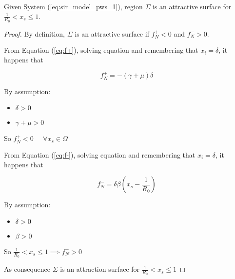 \begin{lemma}
Given System (\ref{eq:sir_model_pws_1}), region $\Sigma$ is an attractive surface for $\frac{1}{R_0} < x_s \leq 1$.
\end{lemma}

\begin{proof}
By definition, $\Sigma$ is an attractive surface if $f^+_N < 0$ and $f^-_N > 0$.

From Equation (\ref{eq:f+}), solving equation and remembering that $x_i = \delta$, it happens that

\begin{equation}
    f^+_N = -(\gamma + \mu)\delta
\end{equation}

By assumption:
\begin{itemize}
    \item $\delta > 0$
    \item $\gamma + \mu > 0$
\end{itemize}
So $f^+_N < 0 \;\;\;\;\; \forall x_s \in \Omega$

From Equation (\ref{eq:f-}), solving equation and remembering that $x_i = \delta$, it happens that

\begin{equation}
    f^-_N = \delta\beta\left(x_s-\frac{1}{R_0}\right)
\end{equation}

By assumption:
\begin{itemize}
    \item $\delta > 0$
    \item $\beta > 0$
\end{itemize}
So $\frac{1}{R_0} < x_s \leq 1 \implies f^-_N > 0$

As consequence $\Sigma$ is an attraction surface for $\frac{1}{R_0} < x_s \leq 1$ 
\end{proof}